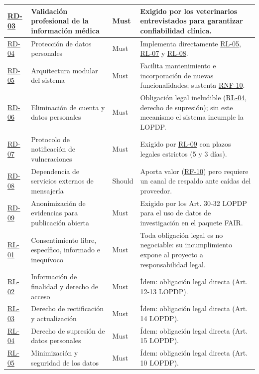 \documentclass[journal,onecolumn]{IEEEtran}
\begin{document}
\begin{longtable}{@{}p{1.6cm} p{4.8cm} p{1.6cm} p{5.2cm}@{}}
		\hline
		\hyperref[tab:RD-03]{RD-03} & Validación profesional de la información médica & Must & Exigido por los veterinarios entrevistados para garantizar confiabilidad clínica. \\
		\hline
		\hyperref[tab:RD-04]{RD-04} & Protección de datos personales & Must & Implementa directamente \hyperref[rl:05]{RL-05}, \hyperref[rl:07]{RL-07} y \hyperref[rl:08]{RL-08}. \\
		\hline
		\hyperref[tab:RD-05]{RD-05} & Arquitectura modular del sistema & Must & Facilita mantenimiento e incorporación de nuevas funcionalidades; sustenta \hyperref[tab:RNF-10]{RNF-10}. \\
		\hline
		\hyperref[tab:RD-06]{RD-06} & Eliminación de cuenta y datos personales & Must & Obligación legal ineludible (\hyperref[rl:04]{RL-04}, derecho de supresión); sin este mecanismo el sistema incumple la LOPDP. \\
		\hline
		\hyperref[tab:RD-07]{RD-07} & Protocolo de notificación de vulneraciones & Must & Exigido por \hyperref[rl:09]{RL-09} con plazos legales estrictos (5 y 3 días). \\
		\hline
		\hyperref[tab:RD-08]{RD-08} & Dependencia de servicios externos de mensajería & Should & Aporta valor (\hyperref[tab:RF-10]{RF-10}) pero requiere un canal de respaldo ante caídas del proveedor. \\
		\hline
		\hyperref[tab:RD-09]{RD-09} & Anonimización de evidencias para publicación abierta & Must & Exigido por los Art. 30-32 LOPDP para el uso de datos de investigación en el paquete FAIR. \\
		\hline
		\hyperref[rl:01]{RL-01} & Consentimiento libre, específico, informado e inequívoco & Must & Toda obligación legal es no negociable: su incumplimiento expone al proyecto a responsabilidad legal. \\
		\hline
		\hyperref[rl:02]{RL-02} & Información de finalidad y derecho de acceso & Must & Ídem: obligación legal directa (Art. 12-13 LOPDP). \\
		\hline
		\hyperref[rl:03]{RL-03} & Derecho de rectificación y actualización & Must & Ídem: obligación legal directa (Art. 14 LOPDP). \\
		\hline
		\hyperref[rl:04]{RL-04} & Derecho de supresión de datos personales & Must & Ídem: obligación legal directa (Art. 15 LOPDP). \\
		\hline
		\hyperref[rl:05]{RL-05} & Minimización y seguridad de los datos & Must & Ídem: obligación legal directa (Art. 10 LOPDP). \\

\end{longtable}
\end{document}
